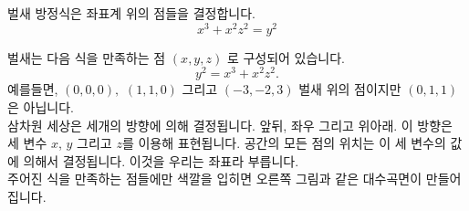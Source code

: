 ﻿\begin{surferPage}{벌새}
방정식은 좌표계 위의 점들을 결정합니다. \\
  
  \smallskip
\[x^3+ x^2	z^2	= y^2\]

\singlespacing
벌새는 다음 식을 만족하는 점 $(x, y, z)$ 로 구성되어 있습니다.
\smallskip
\[ y^2= x^3 + x^2 z^2.\]
\smallskip
예를들면, $(0,0,0),$ $(1,1,0)$ 그리고 $(-3,-2,3)$ 벌새 위의 점이지만 $(0,1,1)$ 은 아닙니다.\\
 \singlespacing
삼차원 세상은 세개의 방향에 의해 결정됩니다. 앞뒤, 좌우 그리고 위아래. 이 방향은 세 변수 $x$, $y$ 그리고 $z$를 이용해 표현됩니다. 공간의 모든 점의 위치는 이 세 변수의 값에 의해서 결정됩니다. 이것을 우리는 좌표라 부릅니다.\\
\singlespacing
주어진 식을 만족하는 점들에만 색깔을 입히면 오른쪽 그림과 같은 대수곡면이 만들어 집니다.
\end{surferPage}

